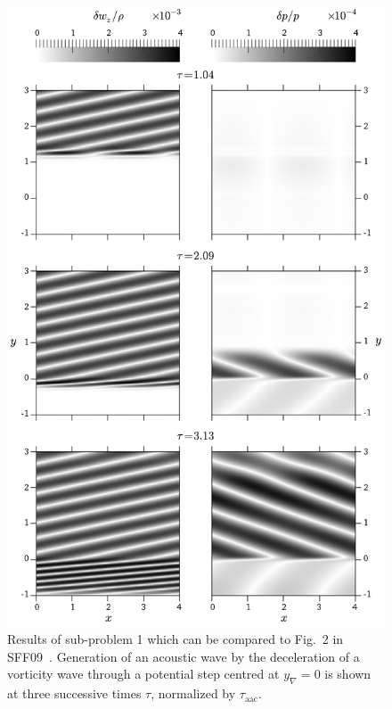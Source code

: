 \begin{figure}
\centering
\includegraphics[width=12cm]{figures/TP1}
\caption {Results of sub-problem 1 which can be compared to Fig.~2 in SFF09~\cite{Sato2009}. Generation of an acoustic wave by the deceleration of a vorticity wave through a potential step centred at $y_\nabla=0$ is shown at three successive times $\tau$, normalized by $\tau_\textrm{aac}$.}
\label{fig:TP1}
\end{figure}

